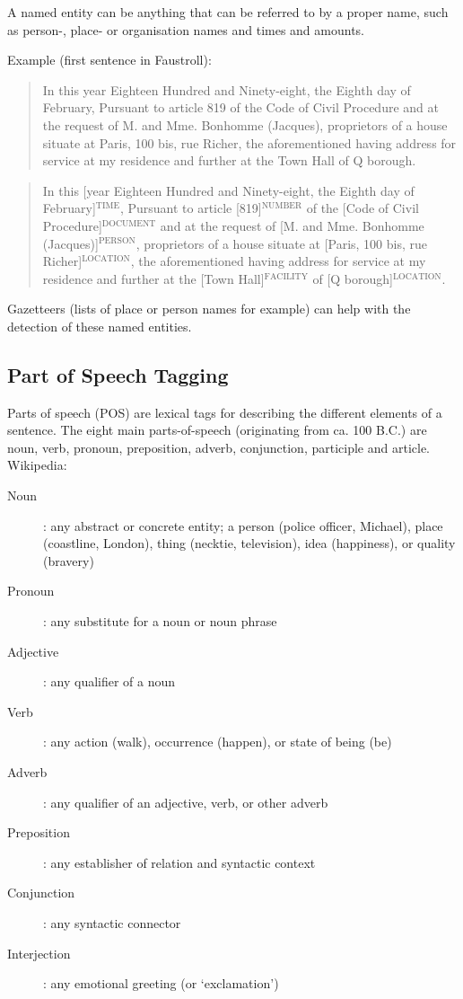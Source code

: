 A named entity can be anything that can be referred to by a proper name, such as person-, place- or organisation names and times and amounts.

Example (first sentence in Faustroll):

\begin{quote}
  In this year Eighteen Hundred and Ninety-eight, the Eighth day of February, Pursuant to article 819 of the Code of Civil Procedure and at the request of M. and Mme. Bonhomme (Jacques), proprietors of a house situate at Paris, 100 bis, rue Richer, the aforementioned having address for service at my residence and further at the Town Hall of Q borough.
\end{quote}

\begin{quote}
  In this [year Eighteen Hundred and Ninety-eight, the Eighth day of February]$^{\text{TIME}}$, Pursuant to article [819]$^{\text{NUMBER}}$ of the [Code of Civil Procedure]$^{\text{DOCUMENT}}$ and at the request of [M. and Mme. Bonhomme (Jacques)]$^{\text{PERSON}}$, proprietors of a house situate at [Paris, 100 bis, rue Richer]$^{\text{LOCATION}}$, the aforementioned having address for service at my residence and further at the [Town Hall]$^{\text{FACILITY}}$ of [Q borough]$^{\text{LOCATION}}$.
\end{quote}

Gazetteers (lists of place or person names for example) can help with the detection of these named entities.


\subsection*{Part of Speech Tagging}

Parts of speech (POS) are lexical tags for describing the different elements of a sentence. The eight main parts-of-speech (originating from ca. 100 B.C.) are noun, verb, pronoun, preposition, adverb, conjunction, participle and article.
Wikipedia:

\begin{description}
  \item [Noun]: any abstract or concrete entity; a person (police officer, Michael), place (coastline, London), thing (necktie, television), idea (happiness), or quality (bravery)
  \item [Pronoun]: any substitute for a noun or noun phrase
  \item [Adjective]: any qualifier of a noun
  \item [Verb]: any action (walk), occurrence (happen), or state of being (be)
  \item [Adverb]: any qualifier of an adjective, verb, or other adverb
  \item [Preposition]: any establisher of relation and syntactic context
  \item [Conjunction]: any syntactic connector
  \item [Interjection]: any emotional greeting (or `exclamation')
\end{description}

